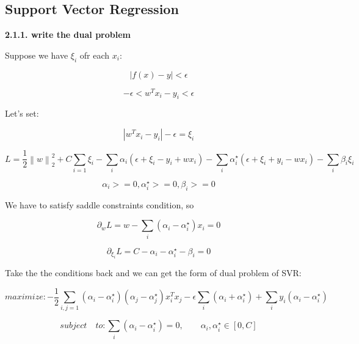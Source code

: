 \documentclass{article} %
\newcommand{\norm}[1]{\left\lVert #1 \right\rVert}
\newcommand{\abs}[1]{\left\lvert #1 \right\rvert}
\begin{document}
\subsection{Support Vector Regression}

\textbf{2.1.1. write the dual problem}

Suppose we have $\xi_i$ ofr each $x_i$:

\begin{equation}
\abs{f(x) - y} < \epsilon
\end{equation}

\begin{equation}
- \epsilon  < w^T x_i - y_i < \epsilon
\end{equation}

Let's set:

\begin{equation}
\abs{w^T x_i - y_i} - \epsilon = \xi_i
\end{equation}

\begin{equation}
L = \frac{1}{2} \norm{w}_2^2 + C \sum_{i=1} \xi_i 
- \sum_i \alpha_i (\epsilon + \xi_i - y_i + w x_i)
- \sum_i \alpha_i^{\star} (\epsilon + \xi_i +y_i - w x_i)
- \sum_i \beta_i \xi_i
\end{equation}

\begin{equation}
\alpha_i >= 0, \alpha_i^{\star} >= 0, \beta_i >= 0
\end{equation}

We have to satisfy saddle constraints condition, so

\begin{equation}
\partial_w L = w - \sum_i (\alpha_i - \alpha_i^{\star}) x_i = 0
\end{equation}

\begin{equation}
\partial_{\xi_i} L = C - \alpha_i -\alpha_i^{\star} - \beta_i = 0
\end{equation}

Take the the conditions back and we can get the form of dual problem of SVR:

\begin{equation}
maximize: - \frac{1}{2} \sum_{i,j=1} (\alpha_i - \alpha_i^{\star})
(\alpha_j - \alpha_j^{\star}) x_i^T x_j
- \epsilon \sum_i (\alpha_i + \alpha_i^{\star})
+ \sum_i y_i (\alpha_i - \alpha_i^{\star})
\end{equation}

\begin{equation}
subject \quad to: \sum_i (\alpha_i - \alpha_i^{\star}) = 0, \qquad
\alpha_i, \alpha_i^{\star} \in [ 0, C]
\end{equation}
\end{document}
